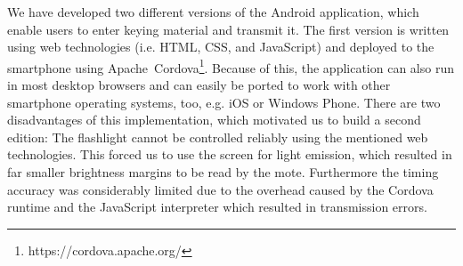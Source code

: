 \documentclass{sig-alternate} %
\begin{document}
We have developed two different versions of the Android application, which enable users to enter keying material and transmit it.
The first version is written using web technologies (i.e. HTML, CSS, and JavaScript) and deployed to the smartphone using Apache~Cordova\footnote{https://cordova.apache.org/}.
Because of this, the application can also run in most desktop browsers and can easily be ported to work with other smartphone operating systems, too, e.g. iOS or Windows Phone.
There are two disadvantages of this implementation, which motivated us to build a second edition:
The flashlight cannot be controlled reliably using the mentioned web technologies.
This forced us to use the screen for light emission, which resulted in far smaller brightness margins to be read by the mote.
Furthermore the timing accuracy was considerably limited due to the overhead caused by the Cordova runtime and the JavaScript interpreter which resulted in transmission errors.
\end{document}
